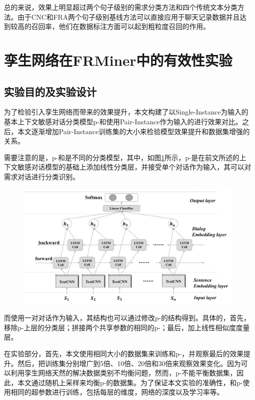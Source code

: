 总的来说，{\tool}效果上明显超过两个句子级别的需求分类方法和四个传统文本分类方法。由于CNC和FRA两个句子级别基线方法可以直接应用于聊天记录数据并且达到较高的召回率，他们在数据标注方面可以起到粗粒度召回的作用。

\section{孪生网络在FRMiner中的有效性实验}
\subsection{实验目的及实验设计}
为了检验引入孪生网络而带来的效果提升，本文构建了以Single-Instance为输入的基本上下文敏感对话分类模型p-{\tool}和使用Pair-Instance作为输入的{\tool}进行效果对比。之后，本文逐渐增加Pair-Instance训练集的大小来检验模型效果提升和数据集增强的关系。


需要注意的是，p-{\tool}和{\tool}是不同的分类模型，其中，如图\ref{fig:model-cls}所示，p-{\tool}是在前文所述的上下文敏感对话模型的基础上添加线性分类层，并接受单个对话作为输入，其可以对需求对话进行分类识别。
\begin{figure}[htbp]
    \centering
    \includegraphics[width=\textwidth]{Img/model_cls.pdf}
    \label{fig:model-cls}
\end{figure}

而{\tool}使用一对对话作为输入，其结构也可以通过修改p-{\tool}的结构得到。具体的，首先，移除p-{\tool}上层的分类层；拼接两个共享参数的相同的p-{\tool}；最后，加上线性相似度度量层。

在实验部分，首先，本文使用相同大小的数据集来训练{\tool}和p-{\tool}，并观察最后的效果提升。然后，把训练集分别增广到5倍、10倍、20倍和30倍来观察效果变化。因为{\tool}可以利用孪生网络天然的解决数据类别不均衡问题，然而，p-{\tool}不能平衡数据集，因此，本文通过随机上采样来均衡p-{\tool}的数据集。为了保证本文实验的准确性，{\tool}和p-{\tool}使用相同的超参数进行训练，包括每层的维度，网络的深度以及学习率等。


